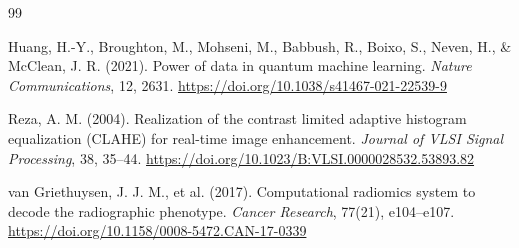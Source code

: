 \begin{thebibliography}{99}

    Huang, H.-Y., Broughton, M., Mohseni, M., Babbush, R., Boixo, S., Neven, H., \& McClean, J. R. (2021). Power of data in quantum machine learning.
    \textit{Nature Communications}, 12, 2631.
    \url{https://doi.org/10.1038/s41467-021-22539-9}


    Reza, A. M. (2004). Realization of the contrast limited adaptive histogram equalization (CLAHE) for real-time image enhancement.
    \textit{Journal of VLSI Signal Processing}, 38, 35--44.
    \url{https://doi.org/10.1023/B:VLSI.0000028532.53893.82}


    van Griethuysen, J. J. M., et al. (2017). Computational radiomics system to decode the radiographic phenotype.
    \textit{Cancer Research}, 77(21), e104--e107.
    \url{https://doi.org/10.1158/0008-5472.CAN-17-0339}

\end{thebibliography}
